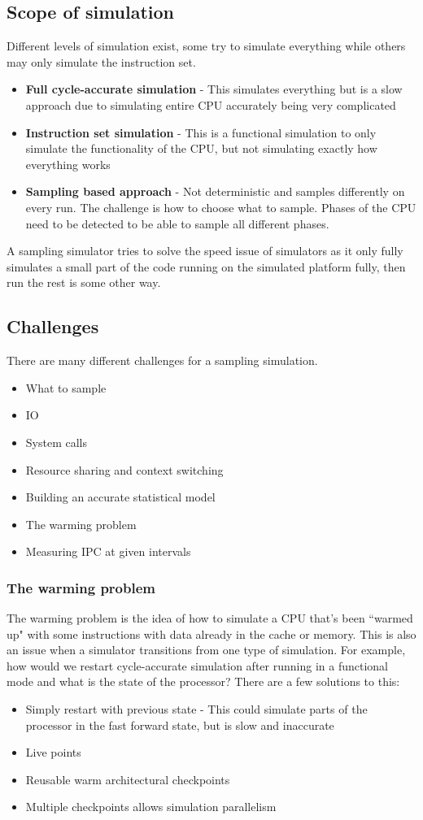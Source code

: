 \documentclass[11pt]{article}
\begin{document}
\subsection{Scope of simulation}
Different levels of simulation exist, some try to simulate everything while others may only simulate the instruction set.
\begin{itemize}
\item \textbf{Full cycle-accurate simulation} - This simulates everything but is a slow approach due to simulating entire CPU accurately being very complicated
\item \textbf{Instruction set simulation} - This is a functional simulation to only simulate the functionality of the CPU, but not simulating exactly how everything works
\item \textbf{Sampling based approach} - Not deterministic and samples differently on every run. The challenge is how to choose what to sample. Phases of the CPU need to be detected to be able to sample all different phases.
\end{itemize}
\noindent
A sampling simulator tries to solve the speed issue of simulators as it only fully simulates a small part of the code running on the simulated platform fully, then run the rest is some other way. 

\subsection{Challenges}
There are many different challenges for a sampling simulation.
\begin{itemize}
\item What to sample
\item IO
\item System calls
\item Resource sharing and context switching
\item Building an accurate statistical model
\item The warming problem
\item Measuring IPC at given intervals
\end{itemize}

\subsubsection{The warming problem}
The warming problem is the idea of how to simulate a CPU that's been ``warmed up" with some instructions with data already in the cache or memory. This is also an issue when a simulator transitions from one type of simulation.
\n
For example, how would we restart cycle-accurate simulation after running in a functional mode and what is the state of the processor? There are a few solutions to this:
\begin{itemize}
\item Simply restart with previous state - This could simulate parts of the processor in the fast forward state, but is slow and inaccurate
\item Live points
\item Reusable warm architectural checkpoints
\item Multiple checkpoints allows simulation parallelism
\end{itemize}
\end{document}
